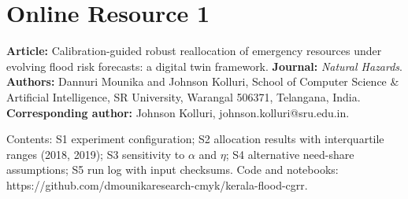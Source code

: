 \documentclass[10pt]{article}
\begin{document}
\section*{Online Resource 1}
\noindent \textbf{Article:} Calibration-guided robust reallocation of emergency resources under evolving flood risk forecasts: a digital twin framework. \textbf{Journal:} \emph{Natural Hazards}. \textbf{Authors:} Dannuri Mounika and Johnson Kolluri, School of Computer Science \& Artificial Intelligence, SR University, Warangal 506371, Telangana, India. \textbf{Corresponding author:} Johnson Kolluri, johnson.kolluri@sru.edu.in.

\noindent Contents: S1 experiment configuration; S2 allocation results with interquartile ranges (2018, 2019); S3 sensitivity to $\alpha$ and $\eta$; S4 alternative need-share assumptions; S5 run log with input checksums. Code and notebooks: https://github.com/dmounikaresearch-cmyk/kerala-flood-cgrr.
\end{document}
